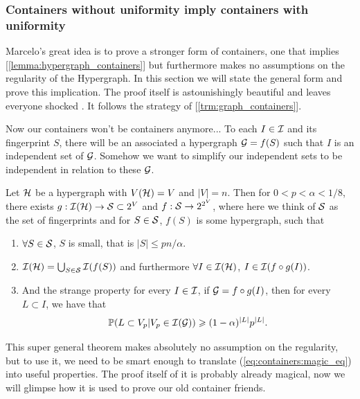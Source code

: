 \subsubsection{Containers without uniformity imply containers with uniformity}

Marcelo's great idea is to prove a stronger form of containers, one that implies
[\ref{lemma:hypergraph_containers}] but furthermore makes no
assumptions on the regularity of the
Hypergraph. In this section we will state the general form and prove
this implication.
The proof itself is astounishingly beautiful
and leaves everyone shocked \Smiley.
It follows the strategy of [\ref{trm:graph_containers}].

Now our containers won't be containers anymore... To each $I \in \mathcal{I}$
and its fingerprint $S$, there will be an associated a hypergraph $\mathcal{G} = f(S)$
such that $I$ is an independent set of $\mathcal{G}$. Somehow we want to
simplify our independent sets to be independent in relation
to these $\mathcal{G}$.

\begin{theorem}
	\label{trm:general_containers}
	Let $\mathcal{H}$ be a hypergraph with $V(\mathcal{H}) = V$ and $|V| = n$. Then for
	$0 < p < \alpha < 1/8$,
	there exists $g : \mathcal{I}(\mathcal{H}) \rightarrow \mathcal{S} \subset 2^V$ and $f:\mathcal{S} \rightarrow
	2^{2^V}$, where here we think of $\mathcal{S}$ as the
	set of fingerprints and for $S \in \mathcal{S}$, $f(S)$ is some hypergraph, such that
	\begin{enumerate}
		\item $\forall S \in \mathcal{S}$, $S$ is small, that is $|S| \leq pn/\alpha$.
		\item $\mathcal{I}(\mathcal{H}) = \bigcup_{S \in \mathcal{S}}\mathcal{I}(f(S))$ and furthermore
			$\forall I \in \mathcal{I}(\mathcal{H})$, $I \in \mathcal{I}(f\circ g(I))$.
		\item And the strange property for every $I \in \mathcal{I}$, if $\mathcal{G} =
			f\circ g(I)$, then
			for every $L \subset I$, we have that
			\begin{equation}
				\label{eq:containers:magic_eq}
				\mathbb{P}(L \subset V_p | V_p \in \mathcal{I}(\mathcal{G})) \geqslant (1-\alpha)^{|L|}p^{|L|}.
			\end{equation}
	\end{enumerate}
\end{theorem}

This super general theorem makes absolutely no assumption on the
regularity, but to use it, we need to be
smart enough to translate (\ref{eq:containers:magic_eq}) into useful
properties. The proof itself of it
is probably already magical, now we will glimpse how it is used to
prove our old container friends.

